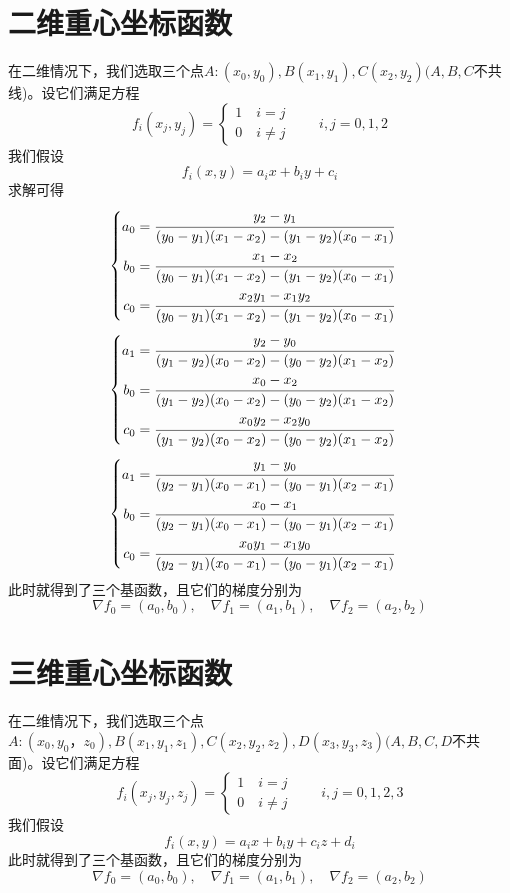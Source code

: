 \documentclass[12pt,a4paper]{article}
\begin{document}
\section{二维重心坐标函数}
在二维情况下，我们选取三个点$A:(x_0,y_0),B(x_1,y_1),C(x_2,y_2)(A,B,C$不共线)。设它们满足方程\begin{equation}
f_i(x_j,y_j)=\begin{cases}1 \quad i=j
\\ 0\quad i\neq j\end{cases}\qquad i,j=0,1,2
\end{equation}
我们假设\begin{equation}
f_i(x,y)=a_ix+b_iy+c_i
\end{equation}
求解可得$$\begin{cases}\begin{aligned}a_0&=\cfrac{y_2-y_1}{(y_0-y_1)(x_1-x_2)-(y_1-y_2)(x_0-x_1)}\\ b_0&=\cfrac{x_1-x_2}{(y_0-y_1)(x_1-x_2)-(y_1-y_2)(x_0-x_1)}\\
c_0&=\cfrac{x_2y_1-x_1y_2}{(y_0-y_1)(x_1-x_2)-(y_1-y_2)(x_0-x_1)}
\end{aligned}\end{cases}$$
$$\begin{cases}\begin{aligned}a_1&=\cfrac{y_2-y_0}{(y_1-y_2)(x_0-x_2)-(y_0-y_2)(x_1-x_2)}\\ b_0&=\cfrac{x_0-x_2}{(y_1-y_2)(x_0-x_2)-(y_0-y_2)(x_1-x_2)}\\
c_0&=\cfrac{x_0y_2-x_2y_0}{(y_1-y_2)(x_0-x_2)-(y_0-y_2)(x_1-x_2)}
\end{aligned}\end{cases}$$
$$\begin{cases}\begin{aligned}a_1&=\cfrac{y_1-y_0}{(y_2-y_1)(x_0-x_1)-(y_0-y_1)(x_2-x_1)}\\ b_0&=\cfrac{x_0-x_1}{(y_2-y_1)(x_0-x_1)-(y_0-y_1)(x_2-x_1)}\\
c_0&=\cfrac{x_0y_1-x_1y_0}{(y_2-y_1)(x_0-x_1)-(y_0-y_1)(x_2-x_1)}
\end{aligned}\end{cases}$$
此时就得到了三个基函数，且它们的梯度分别为$$\nabla f_0=(a_0,b_0),\quad \nabla f_1=(a_1,b_1),\quad \nabla f_2=(a_2,b_2)$$
\section{三维重心坐标函数}
在二维情况下，我们选取三个点$A:(x_0,y_0，z_0),B(x_1,y_1,z_1),C(x_2,y_2,z_2),D(x_3,y_3,z_3)(A,B,C,D$不共面)。设它们满足方程\begin{equation}
f_i(x_j,y_j,z_j)=\begin{cases}1 \quad i=j
\\ 0\quad i\neq j\end{cases}\qquad i,j=0,1,2,3
\end{equation}
我们假设\begin{equation}
f_i(x,y)=a_ix+b_iy+c_iz+d_i
\end{equation}
此时就得到了三个基函数，且它们的梯度分别为$$\nabla f_0=(a_0,b_0),\quad \nabla f_1=(a_1,b_1),\quad \nabla f_2=(a_2,b_2)$$
\end{document}
